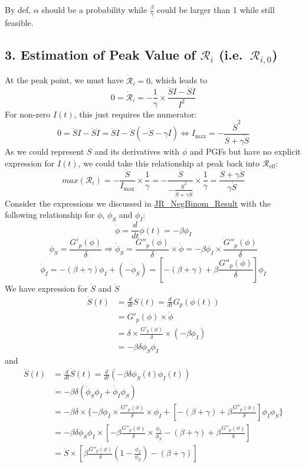 \documentclass[
]{article}
\begin{document}
By def, \(\alpha\) should be a probability while
\(\frac{\beta}{\gamma}\) could be larger than 1 while still feasible.

\subsection{\texorpdfstring{3. Estimation of Peak Value of
\(\mathcal{R}_{i}\)
(i.e.~\(\mathcal{R}_{i,0}\))}{3. Estimation of Peak Value of \textbackslash mathcal\{R\}\_\{i\} (i.e.~\textbackslash mathcal\{R\}\_\{i,0\})}}\label{estimation-of-peak-value-of-mathcalr_i-i.e.-mathcalr_i0}

At the peak point, we must have \(\dot{\mathcal{R}}_{i}=0\), which leads
to
\[0=\dot{\mathcal{R}}_{i}=-\frac{1}{\gamma}\times\frac{\ddot{S}I-\dot{S}\dot{I}}{I^2}\]
For non-zero \(I(t)\), this just requires the numerator:
\[0=\ddot{S}I-\dot{S}\dot{I}=\ddot{S}I-\dot{S}(-\dot{S}-\gamma I) \Leftrightarrow I_\text{max}=-\frac{\dot{S}^2}{\ddot{S}+\gamma\dot{S}}\]
As we could represent \(S\) and its derivatives with \(\phi\) and PGFs
but have no explicit expression for \(I(t)\), we could take this
relationship at peak back into \(\mathcal{R}_\text{eff}\):
\[max(\mathcal{R}_{i})=-\frac{\dot{S}}{I_\text{max}}\times\frac{1}{\gamma}=-\frac{\dot{S}}{-\frac{\dot{S}^2}{\ddot{S}+\gamma\dot{S}}}\times\frac{1}{\gamma}=\frac{\ddot{S}+\gamma\dot{S}}{\gamma\dot{S}}\]
Consider the expressions we discussed in \url{JR_NegBinom_Result} with
the following relationship for \(\phi\), \(\phi_S\) and \(\phi_I\):
\[\dot{\phi}=\frac{d}{dt}\phi(t)=-\beta\phi_I\]
\[\phi_S=\frac{G'_p(\phi)}{\delta} \Rightarrow\dot{\phi}_S=\frac{G''_p(\phi)}{\delta}\times\dot{\phi}=-\beta\phi_I \times \frac{G''_p(\phi)}{\delta}\]
\[\dot{\phi}_I=-(\beta+\gamma)\phi_I+(-\dot{\phi}_S)=[-(\beta+\gamma)+\beta\frac{G''_p(\phi)}{\delta}] \phi_I\]
We have expression for \(\dot{S}\) and \(\ddot{S}\) \[\begin{aligned}
\dot{S}(t) & =\frac{d}{dt}S(t)=\frac{d}{dt}G_p(\phi(t))
\\
& = G'_p(\phi)\times \dot{\phi}
\\
& = \delta \times \frac{G'_p(\phi)}{\delta} \times(-\beta\phi_I)
\\
& = -\beta \delta \phi_S\phi_I
\end{aligned}\] and \[\begin{aligned}
\ddot{S}(t) & =\frac{d}{dt}\dot{S}(t)=\frac{d}{dt}(-\beta\delta\phi_S(t)\phi_I(t))
\\
& = -\beta\delta(\dot{\phi}_S\phi_I+\dot{\phi}_I\phi_S)
\\
& = -\beta\delta\times\{-\beta\phi_I \times \frac{G''_p(\phi)}{\delta}\times\phi_I+[-(\beta+\gamma)+\beta\frac{G''_p(\phi)}{\delta}]\phi_I\phi_S\}
\\
& = -\beta\delta\phi_S\phi_I \times [-\beta\frac{G''_p(\phi)}{\delta}\times\frac{\phi_I}{\phi_S}-(\beta+\gamma)+\beta\frac{G''_p(\phi)}{\delta}]
\\
& = \dot{S} \times[\beta\frac{G''_p(\phi)}{\delta}(1-\frac{\phi_I}{\phi_S})-(\beta+\gamma)]
\end{aligned}\]
\end{document}
